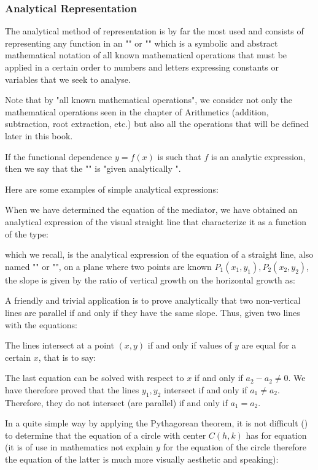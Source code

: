 	\subsubsection{Analytical Representation}
	The analytical method of representation is by far the most used and consists of representing any function in an "" or "" which is a symbolic and abstract mathematical notation of all known mathematical operations that must be applied in a certain order to numbers and letters expressing constants or variables that we seek to analyse.
	
	Note that by "all known mathematical operations", we consider not only the mathematical operations seen in the chapter of Arithmetics (addition, subtraction, root extraction, etc.) but also all the operations that will be defined later in this book.
	
	If the functional dependence $y=f(x)$ is such that $f$ is an analytic expression, then we say that the "" is "given analytically ". 

	Here are some examples of simple analytical expressions:
	
	When we have determined the equation of the mediator, we have obtained an analytical expression of the visual straight line that characterize it as a function of the type:
	
	which we recall, is the analytical expression of the equation of a straight line, also named "" or "", on a plane where two points are known $P_1(x_1,y_1),P_2(x_2,y_2)$, the slope is given by the ratio of vertical growth on the horizontal growth as:
	
	A friendly and trivial application is to prove analytically that two non-vertical lines are parallel if and only if they have the same slope. Thus, given two lines with the equations:
	
	The lines intersect at a point $(x, y)$ if and only if values of $y$ are equal for a certain $x$, that is to say:
	
	The last equation can be solved with respect to $x$ if and only if $a_2-a_2\neq 0$. We have therefore proved that the lines $y_1,y_2$ intersect if and only if $a_1\neq a_2$. Therefore, they do not intersect (are parallel) if and only if $a_1=a_2$.
	
	In a quite simple way by applying the Pythagorean theorem, it is not difficult () to determine that the equation of a circle with center $C (h, k)$ has for equation (it is of use in mathematics not explain $y$ for the equation of the circle therefore the equation of the latter is much more visually aesthetic and speaking):
	
